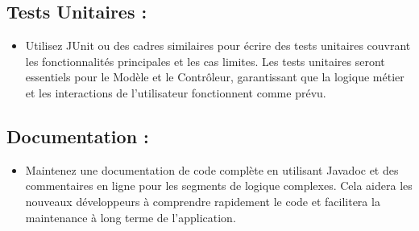 \documentclass{article}
\begin{document}
\subsection{Tests Unitaires :}
\begin{itemize}
  \item Utilisez JUnit ou des cadres similaires pour écrire des tests unitaires couvrant les fonctionnalités principales et les cas limites. Les tests unitaires seront essentiels pour le Modèle et le Contrôleur, garantissant que la logique métier et les interactions de l'utilisateur fonctionnent comme prévu.
\end{itemize}
\subsection{Documentation :}
\begin{itemize}
  \item Maintenez une documentation de code complète en utilisant Javadoc et des commentaires en ligne pour les segments de logique complexes. Cela aidera les nouveaux développeurs à comprendre rapidement le code et facilitera la maintenance à long terme de l'application.
\end{itemize}
\end{document}
